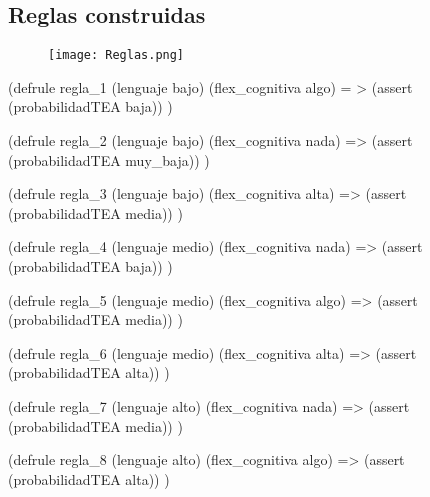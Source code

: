 \documentclass[letterpaper,12pt]{article}
\begin{document}
\begin{figure}[h!]
	\begin{subfigure}
		\texttt{[image: Flex.cogni.png]}
	\end{subfigure}
	\hfill
	\begin{subfigure}
		\texttt{[image: flex.png]}
	\end{subfigure}
\end{figure}

\begin{figure}[h!]
	\begin{subfigure}
		\texttt{[image: probabilidad.png]}
	\end{subfigure}
	\hfill
	\begin{subfigure}
		\texttt{[image: prob.png]}
	\end{subfigure}
\end{figure}
 \newpage
\subsection{Reglas construidas}
\begin{figure}[htb]
	\begin{center}
		\texttt{[image: Reglas.png]}
	\end{center}
\end{figure}

(defrule regla\_1
(lenguaje bajo)
(flex\_cognitiva algo)
= \textgreater
(assert (probabilidadTEA baja))
)

(defrule regla\_2
(lenguaje bajo)
(flex\_cognitiva nada)
=\textgreater
(assert (probabilidadTEA muy\_baja))
)

(defrule regla\_3
(lenguaje bajo)
(flex\_cognitiva alta)
=\textgreater
(assert (probabilidadTEA media))
)

(defrule regla\_4
(lenguaje medio)
(flex\_cognitiva nada)
=\textgreater
(assert (probabilidadTEA baja))
)

(defrule regla\_5
(lenguaje medio)
(flex\_cognitiva algo)
=\textgreater
(assert (probabilidadTEA media))
)

(defrule regla\_6
(lenguaje medio)
(flex\_cognitiva alta)
=\textgreater
(assert (probabilidadTEA alta))
)

(defrule regla\_7
(lenguaje alto)
(flex\_cognitiva nada)
=\textgreater
(assert (probabilidadTEA media))
)

(defrule regla\_8
(lenguaje alto)
(flex\_cognitiva algo)
=\textgreater
(assert (probabilidadTEA alta))
)
\end{document}
